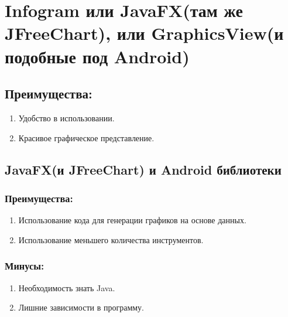 \documentclass[a4paper, 12pt]{article}
\begin{document}
	\section{Infogram\cite{Infogram} или JavaFX\cite{JavaFX}(там же JFreeChart\cite{JFreeChart}), или GraphicsView\cite{GraphicsView}(и подобные под Android)}
	\subsection{Преимущества:}
		\begin{enumerate}
			\item Удобство в использовании.
			\item Красивое графическое представление.
		\end{enumerate}
	\subsection{JavaFX\cite{JavaFX}(и JFreeChart\cite{JFreeChart}) и Android библиотеки}
		\subsubsection{Преимущества:}
		\begin{enumerate}
			\item Использование кода для генерации графиков на основе данных.
			\item Использование меньшего количества инструментов.
		\end{enumerate}
		\subsubsection{Минусы:}
			\begin{enumerate}
				\item Необходимость знать Java\cite{Java}.
				\item Лишние зависимости в программу.
			\end{enumerate}
	
\end{document}

